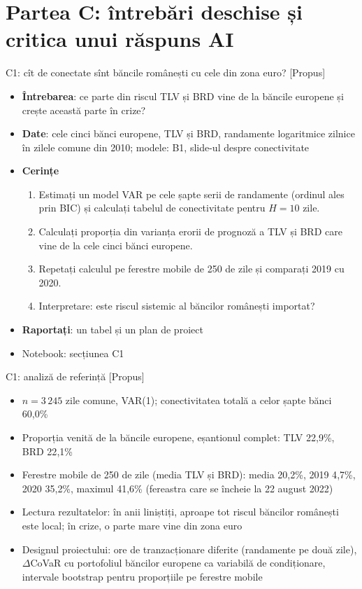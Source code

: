 \section{Partea C: întrebări deschise și critica unui răspuns AI}

\begin{frame}{C1: cît de conectate sînt băncile românești cu cele din zona euro? [Propus]}
\itemsize{\footnotesize}
\begin{itemize}
\item \textbf{Întrebarea}: ce parte din riscul TLV și BRD vine de la băncile europene și crește această parte în crize?
\item \textbf{Date}: cele cinci bănci europene, TLV și BRD, randamente logaritmice zilnice în zilele comune din 2010; modele: B1, slide-ul despre conectivitate
\item \textbf{Cerințe}
\begin{enumerate}
    \item Estimați un model VAR pe cele șapte serii de randamente (ordinul ales prin BIC) și calculați tabelul de conectivitate pentru $H = 10$ zile.
    \item Calculați proporția din varianța erorii de prognoză a TLV și BRD care vine de la cele cinci bănci europene.
    \item Repetați calculul pe ferestre mobile de 250 de zile și comparați 2019 cu 2020.
    \item Interpretare: este riscul sistemic al băncilor românești importat?
\end{enumerate}
\item \textbf{Raportați}: un tabel și un plan de proiect
\item Notebook: secțiunea C1
\end{itemize}
\end{frame}

\ifsolutions
\begin{frame}{C1: analiză de referință [Propus]}
\itemsize{\footnotesize}
\begin{itemize}
    \item $n = 3\,245$ zile comune, VAR(1); conectivitatea totală a celor șapte bănci 60{,}0\%
    \item Proporția venită de la băncile europene, eșantionul complet: TLV 22{,}9\%, BRD 22{,}1\%
    \item Ferestre mobile de 250 de zile (media TLV și BRD): media 20{,}2\%, 2019 4{,}7\%, 2020 35{,}2\%, maximul 41{,}6\% (fereastra care se încheie la 22 august 2022)
    \item Lectura rezultatelor: în anii liniștiți, aproape tot riscul băncilor românești este local; în crize, o parte mare vine din zona euro
    \item Designul proiectului: ore de tranzacționare diferite (randamente pe două zile), $\Delta$CoVaR cu portofoliul băncilor europene ca variabilă de condiționare, intervale bootstrap pentru proporțiile pe ferestre mobile
\end{itemize}
\end{frame}
\fi

